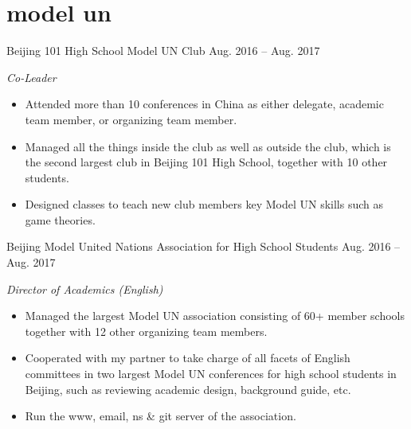 \documentclass[hidelinks]{adamyi-cv} %
\begin{document}

\section{model un}

\begin{entrylist}


\entry
{Beijing 101 High School Model UN Club}
{Aug. 2016 -- Aug. 2017}
{\emph{Co-Leader}
\begin{itemize}
\item Attended more than 10 conferences in China as either delegate, academic team member, or organizing team member.
\item Managed all the things inside the club as well as outside the club, which is the second largest club in Beijing 101 High School, together with 10 other students.
\item Designed classes to teach new club members key Model UN skills such as game theories.
\end{itemize}}


\entry
{Beijing Model United Nations Association for High School Students}
{Aug. 2016 -- Aug. 2017}
{\emph{Director of Academics (English)}
\begin{itemize}
\item Managed the largest Model UN association consisting of 60+ member schools together with 12 other organizing team members.
\item Cooperated with my partner to take charge of all facets of English committees in two largest Model UN conferences for high school students in Beijing, such as reviewing academic design, background guide, etc.
\item Run the www, email, ns \& git server of the association.
\end{itemize}}


\end{entrylist}

\pagebreak


\end{document}
